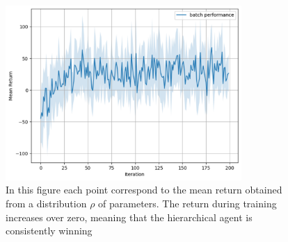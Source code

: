 \begin{figure}
    \centering
    \includegraphics[width=0.8\textwidth]{Images/pgpe_return.pdf}
    \caption[PGPE mean return.]{In this figure each point correspond to the mean return obtained from a distribution $\rho$ of parameters. The return during training increases
    over zero, meaning that the hierarchical agent is consistently winning}
    \label{fig:pgpe_return}
\end{figure}